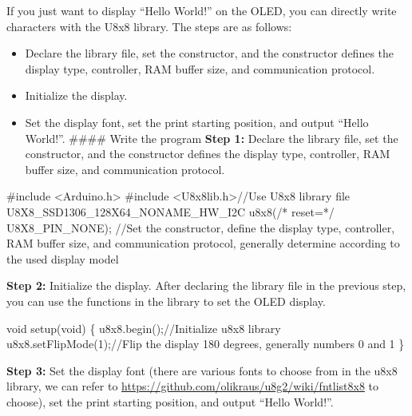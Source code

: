 \documentclass[
  letterpaper,
  DIV=11,
  numbers=noendperiod]{scrreprt}
\newenvironment{Shaded}{\begin{snugshade}}{\end{snugshade}}
\newcommand{\CommentTok}[1]{\textcolor[rgb]{0.37,0.37,0.37}{#1}}
\newcommand{\DataTypeTok}[1]{\textcolor[rgb]{0.68,0.00,0.00}{#1}}
\newcommand{\DecValTok}[1]{\textcolor[rgb]{0.68,0.00,0.00}{#1}}
\newcommand{\ImportTok}[1]{\textcolor[rgb]{0.00,0.46,0.62}{#1}}
\newcommand{\NormalTok}[1]{\textcolor[rgb]{0.00,0.23,0.31}{#1}}
\newcommand{\OperatorTok}[1]{\textcolor[rgb]{0.37,0.37,0.37}{#1}}
\newcommand{\PreprocessorTok}[1]{\textcolor[rgb]{0.68,0.00,0.00}{#1}}
\providecommand{\tightlist}{%
  \setlength{\itemsep}{0pt}\setlength{\parskip}{0pt}}\usepackage{longtable,booktabs,array}
\begin{document}
If you just want to display ``Hello World!'' on the OLED, you can
directly write characters with the U8x8 library. The steps are as
follows:

\begin{itemize}
\tightlist
\item
  Declare the library file, set the constructor, and the constructor
  defines the display type, controller, RAM buffer size, and
  communication protocol.
\item
  Initialize the display.
\item
  Set the display font, set the print starting position, and output
  ``Hello World!''. \#\#\#\# Write the program \textbf{Step 1:} Declare
  the library file, set the constructor, and the constructor defines the
  display type, controller, RAM buffer size, and communication protocol.
\end{itemize}

\begin{Shaded}
\begin{Highlighting}[]
\PreprocessorTok{\#include }\ImportTok{\textless{}Arduino.h\textgreater{}}
\PreprocessorTok{\#include }\ImportTok{\textless{}U8x8lib.h\textgreater{}}\CommentTok{//Use U8x8 library file}
\NormalTok{U8X8\_SSD1306\_128X64\_NONAME\_HW\_I2C u8x8}\OperatorTok{(}\CommentTok{/* reset=*/}\NormalTok{ U8X8\_PIN\_NONE}\OperatorTok{);}
\CommentTok{//Set the constructor, define the display type, controller, RAM buffer size, and communication protocol, generally determine according to the used display model}
\end{Highlighting}
\end{Shaded}

\textbf{Step 2:} Initialize the display. After declaring the library
file in the previous step, you can use the functions in the library to
set the OLED display.

\begin{Shaded}
\begin{Highlighting}[]
\DataTypeTok{void}\NormalTok{ setup}\OperatorTok{(}\DataTypeTok{void}\OperatorTok{)} \OperatorTok{\{}
\NormalTok{    u8x8}\OperatorTok{.}\NormalTok{begin}\OperatorTok{();}\CommentTok{//Initialize u8x8 library}
\NormalTok{    u8x8}\OperatorTok{.}\NormalTok{setFlipMode}\OperatorTok{(}\DecValTok{1}\OperatorTok{);}\CommentTok{//Flip the display 180 degrees, generally numbers 0 and 1}
\OperatorTok{\}}
\end{Highlighting}
\end{Shaded}

\textbf{Step 3:} Set the display font (there are various fonts to choose
from in the u8x8 library, we can refer to
\url{https://github.com/olikraus/u8g2/wiki/fntlist8x8} to choose), set
the print starting position, and output ``Hello World!''.
\end{document}
